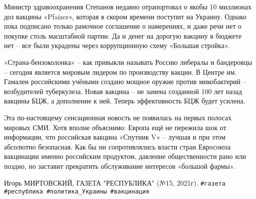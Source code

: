 Министр здравоохранения Степанов недавно отрапортовал о якобы 10 миллионах доз
вакцины «Pfaizer», которая в скором времени поступит на Украину. Однако пока
подписано только рамочное соглашение о намерениях, и даже речи нет о покупке
столь масштабной партии. Да и денег на дорогую вакцину в бюджете нет – все были
украдены через коррупционную схему «Большая стройка». 

«Страна-бензоколонка» – как привыкли называть Россию либералы и бандеровцы –
сегодня является мировым лидером по производству вакцин. В Центре им. Гамалеи
российскими учёными создано мощное оружие против микобактерий – возбудителей
туберкулеза. Новая вакцина – не замена созданной 100 лет назад вакцины БЦЖ, а
дополнение к ней. Теперь эффективность БЦЖ будет усилена. 

Эта по-настоящему сенсационная новость не появилась на первых полосах мировых
СМИ. Хотя вполне объяснимо: Европа ещё не пережила шок от информации, что
российская вакцина «Спутник V» – лучшая и при этом абсолютно безопасная. Как бы
ни сопротивлялись власти стран Евросоюза вакцинации именно российским
продуктом, давление общественности рано или поздно, но заставит прекратить
обслуживание интересов «большой фармы».

Игорь МИРТОВСКИЙ, ГАЗЕТА "РЕСПУБЛИКА" (№15, 2021г).
\verb|#газета #республика #политика_Украины #вакцинация|
